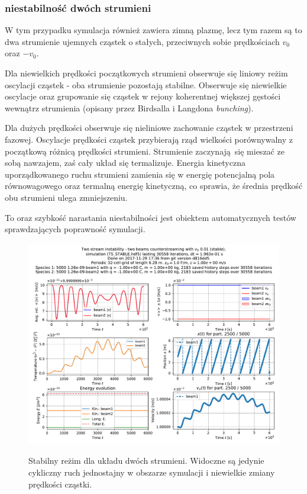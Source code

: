     \subsubsection{niestabilność dwóch strumieni}
W tym przypadku symulacja również zawiera zimną plazmę, lecz tym razem są to dwa strumienie ujemnych cząstek
o stałych, przeciwnych sobie prędkościach $v_0$ oraz $-v_0$.

    Dla niewielkich prędkości początkowych strumieni obserwuje się
    liniowy reżim oscylacji cząstek - oba strumienie pozostają stabilne. Obserwuje się niewielkie oscylacje oraz
grupowanie się cząstek w rejony koherentnej większej gęstości wewnątrz strumienia (opisany przez Birdsalla i Langdona \emph{bunching}).

    Dla dużych prędkości obserwuje się nieliniowe
    zachowanie cząstek w przestrzeni fazowej. Oscylacje prędkości cząstek przybierają rząd wielkości porównywalny
    z początkową różnicą prędkości strumieni.
 Strumienie zaczynają się mieszać ze sobą nawzajem, zaś cały układ się termalizuje. Energia kinetyczna
 uporządkowanego ruchu strumieni zamienia się w energię potencjalną pola równowagowego 
oraz termalną energię kinetyczną, co sprawia, że średnia prędkość obu strumieni ulega zmniejszeniu. 

To oraz szybkość narastania niestabilności jest obiektem automatycznych testów sprawdzających poprawność symulacji.

\begin{figure}[h!]
  \includegraphics[width=\textwidth]{Images/TS_STABLE}
  \label{fig:twostream-stable}
  \caption{Stabilny reżim dla układu dwóch strumieni. Widoczne są jedynie cykliczny ruch jednostajny w obszarze symulacji i niewielkie zmiany prędkości cząstki.}
\end{figure}

